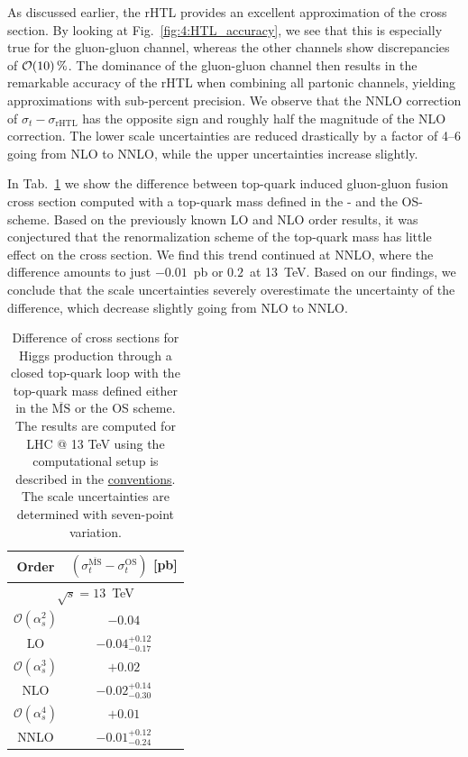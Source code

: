As discussed earlier, the \acs{rHTL} provides an excellent approximation of the cross section. By looking at Fig.~\ref{fig:4:HTL_accuracy}, we see that this is especially true for the gluon-gluon channel, whereas the other channels show discrepancies of $\mathcal{O}\!\left(10\right)\%$. The dominance of the gluon-gluon channel then results in the remarkable accuracy of the \acs{rHTL} when combining all partonic channels, yielding approximations with sub-percent precision. We observe that the \acs{NNLO} correction of $\sigma_t - \sigma_{\text{rHTL}}$ has the opposite sign and roughly half the magnitude of the \acs{NLO} correction. The lower scale uncertainties are reduced drastically by a factor of 4--6 going from \acs{NLO} to \acs{NNLO}, while the upper uncertainties increase slightly.

In Tab.~\ref{tab:6:topSchemeDifference} we show the difference between top-quark induced gluon-gluon fusion cross section computed with a top-quark mass defined in the \MS- and the \acs{OS}-scheme. Based on the previously known \acs{LO} and \acs{NLO} order results, it was conjectured that the renormalization scheme of the top-quark mass has little effect on the cross section. We find this trend continued at \acs{NNLO}, where the difference amounts to just $-0.01$~pb or $0.2$\textperthousand\ at 13~TeV. Based on our findings, we conclude that the scale uncertainties severely overestimate the uncertainty of the difference, which decrease slightly going from \acs{NLO} to \acs{NNLO}.
\begin{table}[t]
  \centering
  \begin{tabular}{cc}
  \hline
      Order & $(\sigma_t^{\overline{\mathrm{MS}}} - \sigma_t^{\mathrm{OS}})$ [pb] \\
  \hline
  \hline
  \multicolumn{2}{c}{$\sqrt{s}=13$~TeV} \\
  \hline
  $\mathcal{O}(\alpha_s^2)$     & $-0.04$ \\
  LO & $-0.04^{+0.12}_{-0.17}$ \\
  \hline
  $\mathcal{O}(\alpha_s^3)$ & $+0.02$ \\
  NLO & $-0.02^{+0.14}_{-0.30}$ \\
  \hline
  $\mathcal{O}(\alpha_s^4)$ & $+0.01$ \\
  NNLO & $-0.01^{+0.12}_{-0.24}$ \\
  \hline
  \end{tabular}
\caption{Difference of cross sections for Higgs production through a closed top-quark loop with the top-quark mass defined either in the $\overline{\mathrm{MS}}$ or the OS scheme. The results are computed for LHC @ 13 TeV using the computational setup is described in the \hyperref[chap:notation_and_conventions]{conventions}. The scale uncertainties are determined with seven-point variation.}
\label{tab:6:topSchemeDifference}
\end{table}

